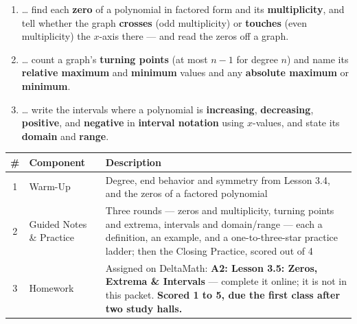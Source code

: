 \documentclass[12pt]{article}
\begin{document}

\namedateperiod
\vspace{0.18in}

\boxguard[14]
\begin{learningtargetbox}
\small
\begin{enumerate}[leftmargin=1.5em, itemsep=5pt]
  \item \ldots{} find each \textbf{zero} of a polynomial in factored form and its
        \textbf{multiplicity}, and tell whether the graph \textbf{crosses} (odd multiplicity) or
        \textbf{touches} (even multiplicity) the $x$-axis there --- and read the zeros off a graph.
  \item \ldots{} count a graph's \textbf{turning points} (at most $n-1$ for degree $n$) and name its
        \textbf{relative maximum} and \textbf{minimum} values and any \textbf{absolute maximum} or
        \textbf{minimum}.
  \item \ldots{} write the intervals where a polynomial is \textbf{increasing},
        \textbf{decreasing}, \textbf{positive}, and \textbf{negative} in \textbf{interval
        notation} using $x$-values, and state its \textbf{domain} and \textbf{range}.
\end{enumerate}
\end{learningtargetbox}

\vspace{0.14in}

\boxguard[14]
\begin{tocbox}
\small
\renewcommand{\arraystretch}{1.5}
\begin{tabularx}{\linewidth}{@{} c l X @{}}
\rowcolor{forestbg}
\textbf{\#} & \textbf{Component} & \textbf{Description} \\
\midrule
1 & Warm-Up & Degree, end behavior and symmetry from Lesson 3.4, and the zeros of a factored
              polynomial \\
2 & Guided Notes \& Practice & Three rounds --- zeros and multiplicity, turning points and
              extrema, intervals and domain/range --- each a definition, an example, and a
              one-to-three-star practice ladder; then the Closing Practice, scored out of 4 \\
3 & Homework & Assigned on DeltaMath: \textbf{A2: Lesson 3.5: Zeros, Extrema \& Intervals} --- complete it
              online; it is not in this packet. \textbf{Scored 1 to 5, due the first class after
              two study halls.} \\
\end{tabularx}
\end{tocbox}
\end{document}
